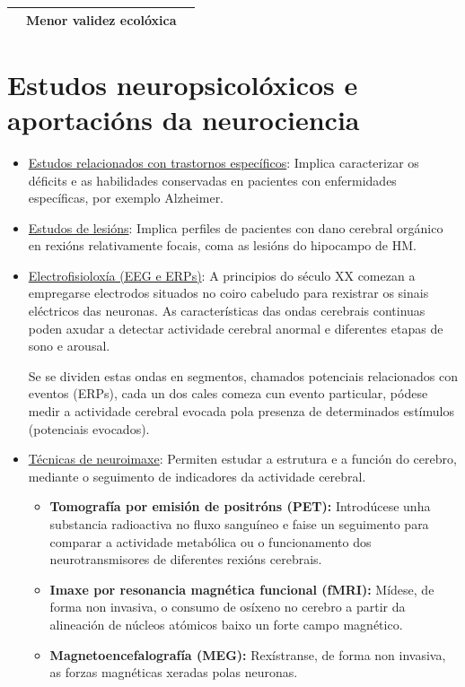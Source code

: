 \documentclass[a4paper,11pt]{article}
\begin{document}
\begin{table}[h!]
\begin{tabular}{c|c|c|}
\multicolumn{1}{|c|}{}                                  & Menor validez ecolóxica                                                                                                    &                                                                                                                                             \\ \hline
\end{tabular}
\end{table}

\section{Estudos neuropsicolóxicos e aportacións da neurociencia}
\begin{itemize}
	\item \underline{Estudos relacionados con trastornos específicos}: Implica caracterizar os 				déficits e as habilidades conservadas en pacientes con enfermidades específicas, por exemplo 			Alzheimer.
	\item \underline{Estudos de lesións}: Implica perfiles de pacientes con dano cerebral orgánico en 	rexións relativamente focais, coma as lesións do hipocampo de HM. 
	\item \underline{Electrofisioloxía (EEG e ERPs)}: A principios do século XX comezan a empregarse 		electrodos situados no coiro cabeludo para rexistrar os sinais eléctricos das neuronas. As
	características das ondas cerebrais continuas poden axudar a detectar actividade cerebral anormal 
	e diferentes etapas de sono e arousal.
	
	Se se dividen estas ondas en segmentos, chamados potenciais relacionados con eventos (ERPs), cada 
	un dos cales comeza cun evento particular, pódese medir a actividade cerebral evocada pola
	presenza de determinados estímulos (potenciais evocados). 
	\item \underline{Técnicas de neuroimaxe}: Permiten estudar a estrutura e a función do cerebro,
	mediante o seguimento de indicadores da actividade cerebral.
	\begin{itemize}
		\item \textbf{Tomografía por emisión de positróns (PET):} Introdúcese unha substancia
		radioactiva no fluxo sanguíneo e faise un seguimento para comparar a actividade metabólica ou 
		o funcionamento dos neurotransmisores de diferentes rexións cerebrais.
		\item \textbf{Imaxe por resonancia magnética funcional (fMRI):} Mídese, de forma non
		invasiva, o consumo de osíxeno no cerebro a partir da alineación de núcleos atómicos baixo un 
		forte campo magnético. 
		\item \textbf{Magnetoencefalografía (MEG):} Rexístranse, de forma non invasiva, as forzas
		magnéticas xeradas polas neuronas. 
	\end{itemize}
\end{itemize}
\end{document}
